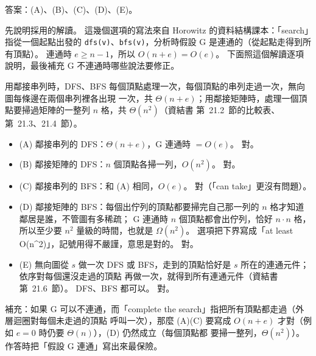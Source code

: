 \begin{pastsoln}
答案：(A)、(B)、(C)、(D)、(E)。

先說明採用的解讀。 這幾個選項的寫法來自 Horowitz 的資料結構課本：「search」指從一個起點出發的
\texttt{dfs(v)}、\texttt{bfs(v)}，分析時假設 G 是連通的（從起點走得到所有頂點）。 連通時
$e \ge n - 1$，所以 $O(n + e) = O(e)$。 下面照這個解讀逐項說明，最後補充 G 不連通時哪些說法要修正。

用鄰接串列時，DFS、BFS 每個頂點處理一次，每個頂點的串列走過一次，無向圖每條邊在兩個串列裡各出現
一次，共 $\Theta(n + e)$；用鄰接矩陣時，處理一個頂點要掃過矩陣的一整列 $n$ 格，共 $\Theta(n^2)$（資結書
第~21.2~節的比較表、第~21.3、21.4~節）。
\begin{itemize}
\item (A) 鄰接串列的 DFS：$\Theta(n + e)$，G 連通時 $= O(e)$。 對。
\item (B) 鄰接矩陣的 DFS：$n$ 個頂點各掃一列，$O(n^2)$。 對。
\item (C) 鄰接串列的 BFS：和 (A) 相同，$O(e)$。 對（「can take」更沒有問題）。
\item (D) 鄰接矩陣的 BFS：每個出佇列的頂點都要掃完自己那一列的 $n$ 格才知道鄰居是誰，不管圖有多稀疏；
G 連通時 $n$ 個頂點都會出佇列，恰好 $n \cdot n$ 格，所以至少要 $n^2$ 量級的時間，也就是
$\Omega(n^2)$。 選項把下界寫成「at least O(n\^{}2)」，記號用得不嚴謹，意思是對的。 對。
\item (E) 無向圖從 $s$ 做一次 DFS 或 BFS，走到的頂點恰好是 $s$ 所在的連通元件；依序對每個還沒走過的頂點
再做一次，就得到所有連通元件（資結書第~21.6~節）。 DFS、BFS 都可以。 對。
\end{itemize}

補充：如果 G 可以不連通，而「complete the search」指把所有頂點都走過（外層迴圈對每個未走過的頂點
呼叫一次），那麼 (A)(C) 要寫成 $O(n + e)$ 才對（例如 $e = 0$ 時仍要 $\Theta(n)$），(D) 仍然成立（每個頂點都
要掃一整列，$\Theta(n^2)$）。 作答時把「假設 G 連通」寫出來最保險。
\end{pastsoln}

